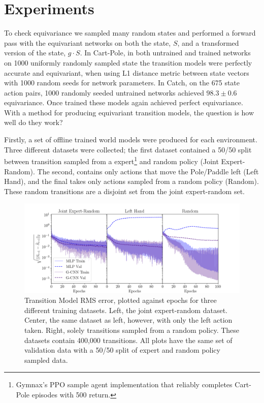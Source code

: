 \documentclass[mlabstract]{jmlr}
\begin{document}
\section{Experiments}

To check equivariance we sampled many random states and performed a forward pass with the equivariant networks  on both the state, $S$, and a transformed version of the state, $g \cdot S$. In Cart-Pole, in both untrained and trained networks on 1000 uniformly randomly sampled state the transition models were perfectly accurate and equivariant, when using L1 distance metric between state vectors with 1000 random seeds for network parameters. In Catch, on the 675 state action pairs, 1000 randomly seeded untrained networks achieved $98.3 \pm 0.6$ equivariance. Once trained these models again achieved perfect equivariance. With a method for producing equivariant transition models, the question is how well do they work?

Firstly, a set of offline trained world models were produced for each environment. Three different datasets were collected; the first dataset contained a 50/50 split between transition sampled from a expert\footnote{Gymnax's PPO sample agent implementation that reliably completes Cart-Pole episodes with 500 return.} and random policy (Joint Expert-Random). The second, contains only actions that move the Pole/Paddle left (Left Hand), and the final takes only actions sampled from a random policy (Random). These random transitions are a disjoint set from the joint expert-random set.

\begin{figure}
	\centering
	\includegraphics[width=.65\textwidth]{Figures/transition_model_loss.png}
	\caption{Transition Model RMS error, plotted against epochs for three different training
		datasets. Left, the joint expert-random dataset. Center, the same dataset as
		left, however, with only the left action taken. Right, solely transitions sampled
		from a random policy. These datasets contain 400,000 transitions. All plots have
		the same set of validation data with a 50/50 split of expert and random policy
		sampled data.}\label{fig:tm_cp}
\end{figure}
\end{document}
